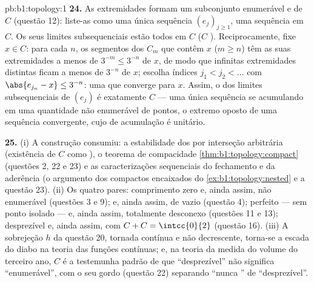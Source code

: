 \begin{solution}{pb:b1:topology:1}
\textbf{24.} As extremidades formam um subconjunto enumerável e 
de $C$ (questão 12): liste-as como uma única sequência $(e_j)_{j\geq1}$,
uma sequência em $C$. Os seus limites subsequenciais estão todos em $C$
($C$ ). Reciprocamente, fixe $x \in C$: para cada $n$, os
segmentos dos $C_m$ que contêm $x$ ($m \geq n$) têm as suas extremidades
a menos de $3^{-m} \leq 3^{-n}$ de $x$, de modo que infinitas extremidades
distintas ficam a menos de $3^{-n}$ de $x$; escolha índices $j_1 < j_2
< \dots$ com $\abs{e_{j_n} - x} \leq 3^{-n}$: uma 
que converge para $x$. Assim, o  dos limites subsequenciais de
$(e_j)$ é exatamente $C$ --- uma única sequência se acumulando em
uma quantidade não enumerável de pontos, o extremo oposto de uma
sequência convergente, cujo  de acumulação é unitário.

\textbf{25.} (i) A construção consumiu: a estabilidade dos 
por interseção arbitrária (existência de $C$ como ),
o teorema de compacidade \cref{thm:b1:topology:compact}
(questões 2, 22 e 23) e as caracterizações sequenciais do
fechamento e da aderência (o argumento dos compactos encaixados do
\cref{ex:b1:topology:nested} e a questão 23). (ii) Os quatro
pares: comprimento zero e, ainda assim, não enumerável (questões 3 e 9);
 e, ainda assim, de  vazio (questão 4); perfeito --- sem
ponto isolado --- e, ainda assim, totalmente desconexo (questões 11 e 13);
desprezível e, ainda assim, com $C + C = \intcc{0}{2}$ (questão 16). (iii)
A sobrejeção $h$ da questão 20, tornada contínua e
não decrescente, torna-se a escada do diabo na teoria das
funções contínuas; e, na teoria da medida do volume do terceiro ano,
$C$ é a testemunha padrão de que ``desprezível'' não significa
``enumerável'', com o seu  gordo (questão 22) separando
``nunca '' de ``desprezível''.
\end{solution}
